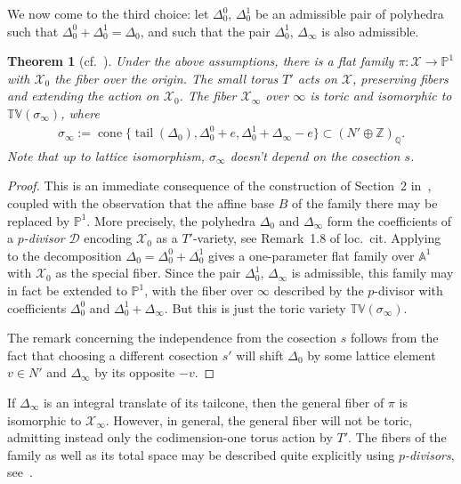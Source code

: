 \documentclass[11pt]{article}
\newcommand{\QQ}{\mathbb{Q}}
\newcommand{\ZZ}{\mathbb Z}
\newcommand{\PP}{\mathbb{P}}
\newcommand{\tv}{\mathbb{TV}}
\newcommand{\D}{\mathcal D}
\newcommand{\cX}{\mathcal{X}}
\DeclareMathOperator{\cone}{cone}
\DeclareMathOperator{\tail}{tail}
\newtheorem{Theorem}{Theorem}[section]
 { \theoremstyle{definition}
\newtheorem{Definition}[Theorem]{Definition}
\newtheorem{Example}[Theorem]{Example}
\newtheorem{Remark}[Theorem]{Remark} }
\begin{document}
We now come to the third choice: let $\Delta_0^0$, $\Delta_0^1$ be an admissible pair of polyhedra such that $\Delta_0^0+\Delta_0^1=\Delta_0$, and such that the pair $\Delta_0^1$, $\Delta_\infty$ is also admissible.

\begin{Theorem}[{cf.~\cite[Theorem~2.8]{ilten:09b}}]\label{thm:family}
Under the above assumptions, there is a flat family \mbox{$\pi\colon \cX \to\PP^1$} with $\cX_0$ the fiber over the origin. The small torus $T'$ acts on $\cX$, preserving fibers and extending the action on $\cX_0$. The fiber $\cX_\infty$ over $\infty$ is toric and isomorphic to $\tv(\sigma_\infty)$, where
\begin{gather*}
\sigma_\infty:=\cone \big\{\tail(\Delta_0),\Delta_0^0+e,\Delta_0^1+\Delta_\infty-e\big\}\subset(N'\oplus \ZZ)_\QQ.
\end{gather*}
Note that up to lattice isomorphism, $\sigma_\infty$ doesn't depend on the cosection $s$.
\end{Theorem}

\begin{proof}
	This is an immediate consequence of the construction of Section~2 in~\cite{ilten:09b}, coupled with the observation that the af\/f\/ine base $B$ of the family there may be replaced by $\PP^1$.
	More precisely, the polyhedra $\Delta_0$ and $\Delta_\infty$ form the coef\/f\/icients of a \emph{$p$-divisor} $\D$ encoding $\cX_0$ as a $T'$-variety, see Remark~1.8 of loc.~cit.  Applying \cite[Theorem~2.8]{ilten:09b} to the decomposition $\Delta_0=\Delta_0^0+\Delta_0^1$ gives a one-parameter f\/lat family over $\mathbb{A}^1$ with $\cX_0$ as the special f\/iber. Since the pair $\Delta_0^1$, $\Delta_\infty$ is admissible, this family may in fact be extended to $\PP^1$, with the f\/iber over $\infty$ described by the $p$-divisor with coef\/f\/icients $\Delta_0^0$ and $\Delta_0^1+\Delta_\infty$. But this is just the toric variety $\tv(\sigma_\infty)$.

	The remark concerning the independence from the cosection $s$ follows from the fact that choosing a dif\/ferent cosection $s'$ will shift $\Delta_0$ by some lattice element $v\in N'$ and $\Delta_\infty$ by its opposite $-v$.
\end{proof}


\begin{Remark}\label{rem:gen}
	If $\Delta_\infty$ is an integral translate of its tailcone, then the general f\/iber of $\pi$ is isomorphic to $\cX_\infty$. However, in general, the general f\/iber will not be toric, admitting instead only the codimension-one torus action by $T'$. The f\/ibers of the family as well as its total space may be described quite explicitly using \emph{$p$-divisors}, see~\cite{altmann:06a}.
\end{Remark}
\end{document}
